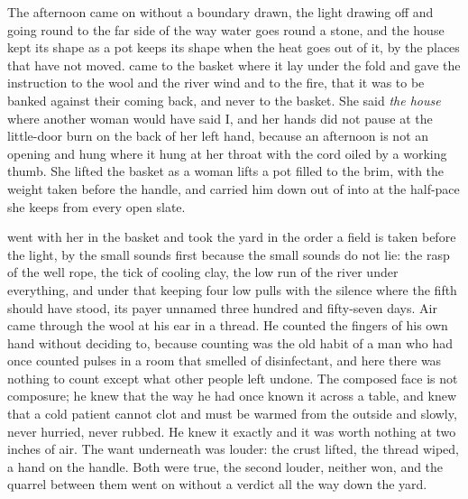 The afternoon came on without a boundary drawn, the light drawing off  and going round to the far side of  the way water goes round a stone, and the house kept its shape as a pot keeps its shape when the heat goes out of it, by the places that have not moved.  came to the basket where it lay under the fold and gave the instruction to the wool and the river wind and to the fire, that it was to be banked against their coming back, and never to the basket. She said \emph{the house} where another woman would have said I, and her hands did not pause at the little-door burn on the back of her left hand, because an afternoon is not an opening and  hung where it hung at her throat with the cord oiled by a working thumb. She lifted the basket as a woman lifts a pot filled to the brim, with the weight taken before the handle, and carried him down out of  into  at the half-pace she keeps from every open slate.

 went with her in the basket and took the yard in the order a field is taken before the light, by the small sounds first because the small sounds do not lie: the rasp of the well rope, the tick of cooling clay, the low run of the river under everything, and under that  keeping four low pulls with the silence where the fifth should have stood, its payer unnamed three hundred and fifty-seven days. Air came through the wool at his ear in a thread. He counted the fingers of his own hand without deciding to, because counting was the old habit of a man who had once counted pulses in a room that smelled of disinfectant, and here there was nothing to count except what other people left undone. The composed face is not composure; he knew that the way he had once known it across a table, and knew that a cold patient cannot clot and must be warmed from the outside and slowly, never hurried, never rubbed. He knew it exactly and it was worth nothing at two inches of air. The want underneath was louder: the crust lifted, the thread wiped, a hand on the handle. Both were true, the second louder, neither won, and the quarrel between them went on without a verdict all the way down the yard.

